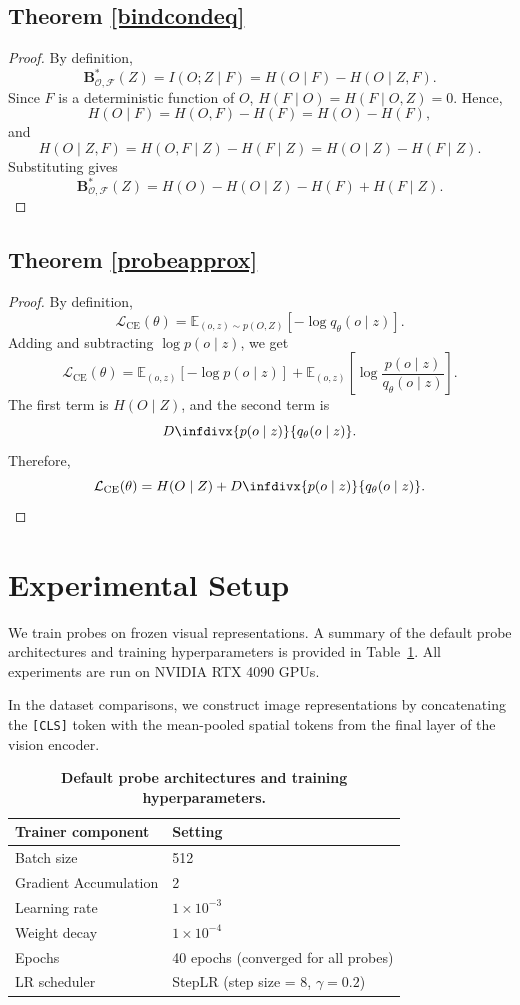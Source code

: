 \documentclass{article}
\newcommand{\infdiv}{D\infdivx}
\theoremstyle{plain}
\theoremstyle{definition}
\theoremstyle{remark}
\begin{document}
\subsection{Theorem \ref{bindcondeq}}
\begin{proof}
By definition,
\[
\mathbf{B}^{*}_{\mathcal{O},\mathcal{F}}(Z)=I(O;Z\mid F)
=H(O\mid F)-H(O\mid Z,F).
\]
Since \(F\) is a deterministic function of \(O\), \(H(F\mid O)=H(F\mid O,Z)=0\). Hence,
\[
H(O\mid F)=H(O,F)-H(F)=H(O)-H(F),
\]
and
\[
H(O\mid Z,F)=H(O,F\mid Z)-H(F\mid Z)
=H(O\mid Z)-H(F\mid Z).
\]
Substituting gives
\[
\mathbf{B}^{*}_{\mathcal{O},\mathcal{F}}(Z)
=H(O)-H(O\mid Z)-H(F)+H(F\mid Z).
\]
\end{proof}
\subsection{Theorem \ref{probeapprox}}
\begin{proof}
By definition,
\[
\mathcal L_{\mathrm{CE}}(\theta)
=
\mathbb{E}_{(o,z)\sim p(O,Z)}
\left[-\log q_\theta(o\mid z)\right].
\]
Adding and subtracting \(\log p(o\mid z)\), we get
\[
\mathcal L_{\mathrm{CE}}(\theta)
=
\mathbb{E}_{(o,z)}
\left[-\log p(o\mid z)\right]
+
\mathbb{E}_{(o,z)}
\left[
\log \frac{p(o\mid z)}{q_\theta(o\mid z)}
\right].
\]
The first term is \(H(O\mid Z)\), and the second term is
\[
\infdiv{p(o\mid z)}{q_\theta(o\mid z)}.
\]
Therefore,
\[
\mathcal L_{\mathrm{CE}}(\theta)
=
H(O\mid Z)
+
\infdiv{p(o\mid z)}{q_\theta(o\mid z)}.
\]
\end{proof}

\section{Experimental Setup}
We train probes on frozen visual representations. A summary of the default probe architectures and training hyperparameters is provided in Table~\ref{tab:training-configs}. All experiments are run on NVIDIA RTX 4090 GPUs.

In the dataset comparisons, we construct image representations by concatenating the \texttt{[CLS]} token with the mean-pooled spatial tokens from the final layer of the vision encoder.

\begin{table}[htbp]
\centering
\caption{\textbf{Default probe architectures and training hyperparameters.}}
\label{tab:training-configs}
\begin{tabular}{ll}
\toprule
\textbf{Trainer component} & \textbf{Setting} \\
\midrule
Batch size & 512 \\
Gradient Accumulation & 2 \\
Learning rate & $1\times10^{-3}$ \\
Weight decay & $1\times10^{-4}$ \\
Epochs & 40 epochs (converged for all probes) \\
LR scheduler & StepLR (step size = 8, $\gamma = 0.2$) \\
\bottomrule
\end{tabular}
\end{table}
\end{document}
